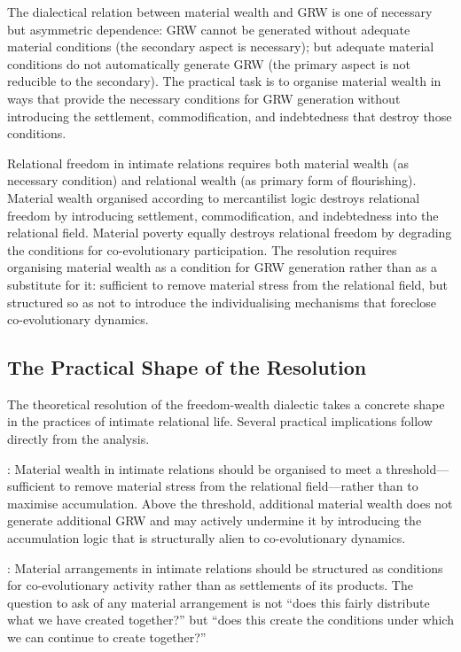 The dialectical relation between material wealth and GRW is one of necessary but asymmetric dependence: GRW cannot be generated without adequate material conditions (the secondary aspect is necessary); but adequate material conditions do not automatically generate GRW (the primary aspect is not reducible to the secondary). The practical task is to organise material wealth in ways that provide the necessary conditions for GRW generation without introducing the settlement, commodification, and indebtedness that destroy those conditions.

\begin{claim}
Relational freedom in intimate relations requires both material wealth (as necessary condition) and relational wealth (as primary form of flourishing). Material wealth organised according to mercantilist logic destroys relational freedom by introducing settlement, commodification, and indebtedness into the relational field. Material poverty equally destroys relational freedom by degrading the conditions for co-evolutionary participation. The resolution requires organising material wealth as a condition for GRW generation rather than as a substitute for it: sufficient to remove material stress from the relational field, but structured so as not to introduce the individualising mechanisms that foreclose co-evolutionary dynamics.
\end{claim}

\subsection{The Practical Shape of the Resolution}
\label{p15:subsec:practical}

\noindent
The theoretical resolution of the freedom-wealth dialectic takes a concrete shape in the practices of intimate relational life. Several practical implications follow directly from the analysis.

: Material wealth in intimate relations should be organised to meet a threshold---sufficient to remove material stress from the relational field---rather than to maximise accumulation. Above the threshold, additional material wealth does not generate additional GRW and may actively undermine it by introducing the accumulation logic that is structurally alien to co-evolutionary dynamics.

: Material arrangements in intimate relations should be structured as conditions for co-evolutionary activity rather than as settlements of its products. The question to ask of any material arrangement is not ``does this fairly distribute what we have created together?'' but ``does this create the conditions under which we can continue to create together?''

